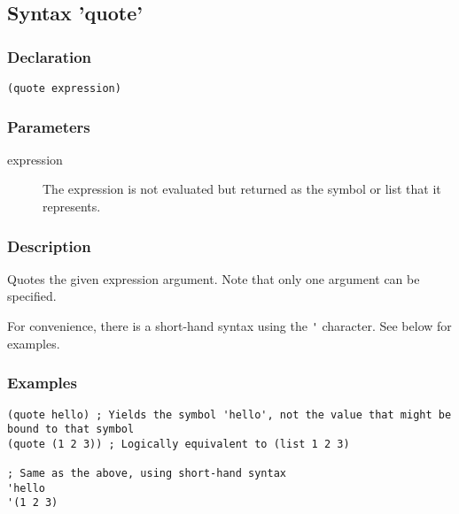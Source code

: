 \subsection{Syntax 'quote'}
\label{builtins/quote}

\subsubsection*{Declaration}
\begin{lstlisting}
(quote expression)
\end{lstlisting}

\subsubsection*{Parameters}
\begin{description}
	\item[expression] The expression is not evaluated but returned as the symbol or list that it represents.
\end{description}

\subsubsection*{Description}
Quotes the given expression argument. Note that only one argument can be specified.

For convenience, there is a short-hand syntax using the \lstinline|'| character. See below for examples.

\subsubsection*{Examples}
\begin{lstlisting}
(quote hello) ; Yields the symbol 'hello', not the value that might be bound to that symbol
(quote (1 2 3)) ; Logically equivalent to (list 1 2 3)

; Same as the above, using short-hand syntax
'hello
'(1 2 3)
\end{lstlisting}
